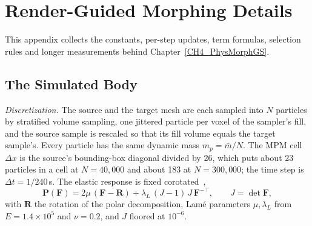 
\clearpage
\chapter{Render-Guided Morphing Details}
\label{app:ch4}

\renewcommand{\theequation}{\thechapter.\arabic{equation}}
\setcounter{equation}{0}

This appendix collects the constants, per-step updates, term formulas, selection rules and longer measurements behind
Chapter~\ref{CH4_PhysMorphGS}.

\section{The Simulated Body}
\label{app:ch4_body}

\textit{Discretization.} The source and the target mesh are each sampled into $N$ particles by stratified volume sampling,
one jittered particle per voxel of the sampler's fill, and the source sample is rescaled so that its fill volume equals
the target sample's. Every particle has the same dynamic mass $m_p=\bar m/N$. The MPM cell $\Delta x$ is the source's
bounding-box diagonal divided by 26, which puts about 23 particles in a cell at $N=40{,}000$ and about 183 at
$N=300{,}000$; the time step is $\Delta t=1/240$\,s. The elastic response is fixed
corotated~\citep{stomakhin2012energetically,2013-mpm},
\begin{equation}
\label{eq:fc_stress}
\mathbf{P}(\mathbf{F})=2\mu\,(\mathbf{F}-\mathbf{R})+\lambda_{L}\,(J-1)\,J\,\mathbf{F}^{-\top},
\qquad J=\det\mathbf{F},
\end{equation}
with $\mathbf{R}$ the rotation of the polar decomposition, Lam\'e parameters $\mu,\lambda_L$ from $E=1.4\times10^{5}$ and
$\nu=0.2$, and $J$ floored at $10^{-6}$.

